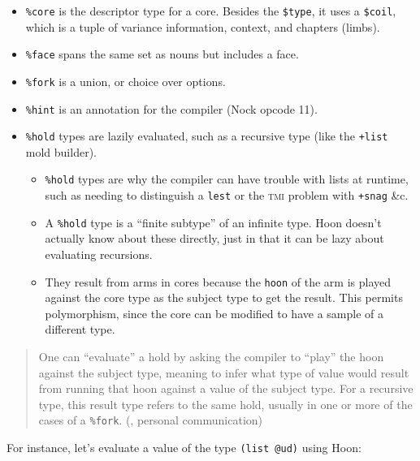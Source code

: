 \documentclass[twoside]{article}
\begin{document}
\begin{itemize}
  \item  \lstinline[style=inlinecode]{%core} is the descriptor type for a core.  Besides the \lstinline[style=inlinecode]{$type}, it uses a \lstinline[style=inlinecode]{$coil}, which is a tuple of variance information, context, and chapters (limbs).
  \item  \lstinline[style=inlinecode]{%face} spans the same set as nouns but includes a face.
  \item  \lstinline[style=inlinecode]{%fork} is a union, or choice over options.
  \item  \lstinline[style=inlinecode]{%hint} is an annotation for the compiler (Nock opcode 11).
  \item  \lstinline[style=inlinecode]{%hold} types are lazily evaluated, such as a recursive type (like the \lstinline[style=inlinecode]{+list} mold builder).
  \begin{itemize}
    \item  \lstinline[style=inlinecode]{%hold} types are why the compiler can have trouble with lists at runtime, such as needing to distinguish a \lstinline[style=inlinecode]{lest} or the \textsc{tmi} problem with \lstinline[style=inlinecode]{+snag} \&c.
    \item  A \lstinline[style=inlinecode]{%hold} type is a “finite subtype” of an infinite type.  Hoon doesn't actually know about these directly, just in that it can be lazy about evaluating recursions.
    \item  They result from arms in cores because the \lstinline[style=inlinecode]{hoon} of the arm is played against the core type as the subject type to get the result.  This permits polymorphism, since the core can be modified to have a sample of a different type.
  \end{itemize}
\end{itemize}

\noindent
\begin{quote}
One can “evaluate” a hold by asking the compiler to “play” the hoon against the subject type, meaning to infer what type of value would result from running that hoon against a value of the subject type. For a recursive type, this result type refers to the same hold, usually in one or more of the cases of a \lstinline[style=inlinecode]{%fork}.  (, personal communication)
\end{quote}

For instance, let's evaluate a value of the type \lstinline[style=inlinecode]{(list @ud)} using Hoon:
\end{document}
